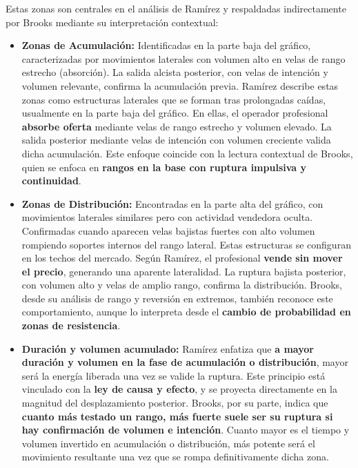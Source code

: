 Estas zonas son centrales en el an\'alisis de Ram\'irez y respaldadas indirectamente por Brooks mediante su interpretaci\'on contextual:

\begin{itemize}
    \item \textbf{Zonas de Acumulaci\'on:} Identificadas en la parte baja del gr\'afico, caracterizadas por movimientos laterales con volumen alto en velas de rango estrecho (absorci\'on). La salida alcista posterior, con velas de intenci\'on y volumen relevante, confirma la acumulaci\'on previa. Ram\'irez describe estas zonas como estructuras laterales que se forman tras prolongadas ca\'idas, usualmente en la parte baja del gr\'afico. En ellas, el operador profesional \textbf{absorbe oferta} mediante velas de rango estrecho y volumen elevado. La salida posterior mediante velas de intenci\'on con volumen creciente valida dicha acumulaci\'on. Este enfoque coincide con la lectura contextual de Brooks, quien se enfoca en \textbf{rangos en la base con ruptura impulsiva y continuidad}.
    
    \item \textbf{Zonas de Distribuci\'on:} Encontradas en la parte alta del gr\'afico, con movimientos laterales similares pero con actividad vendedora oculta. Confirmadas cuando aparecen velas bajistas fuertes con alto volumen rompiendo soportes internos del rango lateral. Estas estructuras se configuran en los techos del mercado. Seg\'un Ram\'irez, el profesional \textbf{vende sin mover el precio}, generando una aparente lateralidad. La ruptura bajista posterior, con volumen alto y velas de amplio rango, confirma la distribuci\'on. Brooks, desde su an\'alisis de rango y reversi\'on en extremos, tambi\'en reconoce este comportamiento, aunque lo interpreta desde el \textbf{cambio de probabilidad en zonas de resistencia}.
    
    \item \textbf{Duraci\'on y volumen acumulado:} Ram\'irez enfatiza que \textbf{a mayor duraci\'on y volumen en la fase de acumulaci\'on o distribuci\'on}, mayor ser\'a la energ\'ia liberada una vez se valide la ruptura. Este principio est\'a vinculado con la \textbf{ley de causa y efecto}, y se proyecta directamente en la magnitud del desplazamiento posterior. Brooks, por su parte, indica que \textbf{cuanto m\'as testado un rango, m\'as fuerte suele ser su ruptura si hay confirmaci\'on de volumen e intenci\'on}. Cuanto mayor es el tiempo y volumen invertido en acumulaci\'on o distribuci\'on, m\'as potente ser\'a el movimiento resultante una vez que se rompa definitivamente dicha zona.
\end{itemize}

